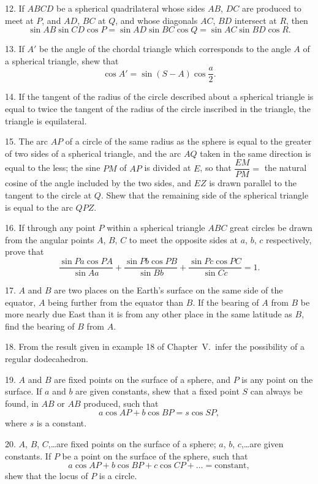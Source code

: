 \documentclass{book}[2004/02/16]
\begin{document}
\begin{mainmatter}
\begin{spacing}{1.3}
12. If $ABCD$ be a spherical quadrilateral whose sides $AB$,
$DC$ are produced to meet at $P$, and $AD$, $BC$ at $Q$, and whose
diagonals $AC$, $BD$ intersect at $R$, then
\[
\sin AB \sin CD \cos P = \sin AD \sin BC \cos Q = \sin AC \sin BD \cos R.
\]

13. If $A'$ be the angle of the chordal triangle which corresponds
to the angle $A$ of a spherical triangle, shew that
\[
\cos A' = \sin (S - A) \cos \frac{a}{2}.
\]

14. If the tangent of the radius of the circle described about a
spherical triangle is equal to twice the tangent of the radius of the
circle inscribed in the triangle, the triangle is equilateral.
\medskip

15. The arc $AP$ of a circle of the same radius as the sphere
is equal to the greater of two sides of a spherical triangle, and
the arc $AQ$ taken in the same direction is equal to the less; the
sine $PM$ of $AP$ is divided at $E$, so that $\dfrac{EM}{PM} =$ the natural cosine
of the angle included by the two sides, and $EZ$ is drawn parallel
to the tangent to the circle at $Q$. Shew that the remaining side
of the spherical triangle is equal to the arc $QPZ$.
\medskip

16. If through any point $P$ within a spherical triangle $ABC$
great circles be drawn from the angular points $A$, $B$, $C$ to meet
the opposite sides at $a$, $b$, $c$ respectively, prove that
\[
\dfrac{\sin Pa \cos PA}{\sin Aa} +
\dfrac{\sin Pb \cos PB}{\sin Bb} +
\dfrac{\sin Pc \cos PC}{\sin Cc} = 1.
\]

17. $A$ and $B$ are two places on the Earth's surface on the
same side of the equator, $A$ being further from the equator
than $B$. If the bearing of $A$ from $B$ be more nearly due East
than it is from any other place in the same latitude as $B$, find
the bearing of $B$ from $A$.
\medskip

18. From the result given in example 18 of Chapter~V.\ infer
the possibility of a regular dodecahedron.
\medskip

19. $A$ and $B$ are fixed points on the surface of a sphere, and
$P$ is any point on the surface. If $a$ and $b$ are given constants,
shew that a fixed point $S$ can always be found, in $AB$ or $AB$ produced,
such that
\[
a \cos AP + b \cos BP = s \cos SP,
\]
where $s$ is a constant.
\medskip

20. $A$, $B$, $C$,\ldots are fixed points on the surface of a sphere;
$a$, $b$, $c$,\ldots are given constants. If $P$ be a point on the surface of
the sphere, such that
\[
a \cos AP + b \cos BP + c \cos CP + \ldots = \text{constant},
\]
shew that the locus of $P$ is a circle.


\end{spacing}
\end{mainmatter}
\end{document}
